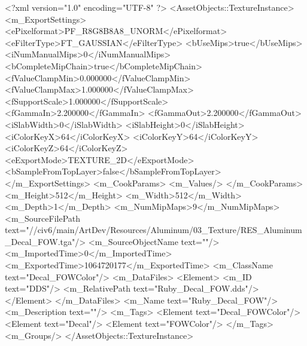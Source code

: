 <?xml version="1.0" encoding="UTF-8" ?>
<AssetObjects::TextureInstance>
	<m_ExportSettings>
		<ePixelformat>PF_R8G8B8A8_UNORM</ePixelformat>
		<eFilterType>FT_GAUSSIAN</eFilterType>
		<bUseMips>true</bUseMips>
		<iNumManualMips>0</iNumManualMips>
		<bCompleteMipChain>true</bCompleteMipChain>
		<fValueClampMin>0.000000</fValueClampMin>
		<fValueClampMax>1.000000</fValueClampMax>
		<fSupportScale>1.000000</fSupportScale>
		<fGammaIn>2.200000</fGammaIn>
		<fGammaOut>2.200000</fGammaOut>
		<iSlabWidth>0</iSlabWidth>
		<iSlabHeight>0</iSlabHeight>
		<iColorKeyX>64</iColorKeyX>
		<iColorKeyY>64</iColorKeyY>
		<iColorKeyZ>64</iColorKeyZ>
		<eExportMode>TEXTURE_2D</eExportMode>
		<bSampleFromTopLayer>false</bSampleFromTopLayer>
	</m_ExportSettings>
	<m_CookParams>
		<m_Values/>
	</m_CookParams>
	<m_Height>512</m_Height>
	<m_Width>512</m_Width>
	<m_Depth>1</m_Depth>
	<m_NumMipMaps>9</m_NumMipMaps>
	<m_SourceFilePath text="//civ6/main/ArtDev/Resources/Aluminum/03_Texture/RES_Aluminum_Decal_FOW.tga"/>
	<m_SourceObjectName text=""/>
	<m_ImportedTime>0</m_ImportedTime>
	<m_ExportedTime>1064720177</m_ExportedTime>
	<m_ClassName text="Decal_FOWColor"/>
	<m_DataFiles>
		<Element>
			<m_ID text="DDS"/>
			<m_RelativePath text="Ruby_Decal_FOW.dds"/>
		</Element>
	</m_DataFiles>
	<m_Name text="Ruby_Decal_FOW"/>
	<m_Description text=""/>
	<m_Tags>
		<Element text="Decal_FOWColor"/>
		<Element text="Decal"/>
		<Element text="FOWColor"/>
	</m_Tags>
	<m_Groups/>
</AssetObjects::TextureInstance>

